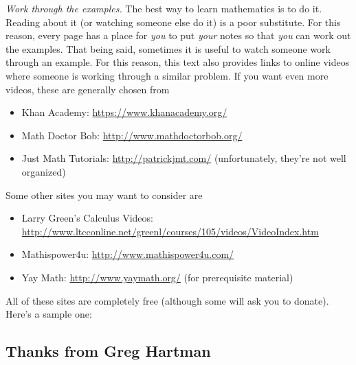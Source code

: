 \emph{Work through the examples.}  The best way to learn mathematics is to do it.  Reading about it (or watching someone else do it) is a poor substitute.  For this reason, every page has a place for \emph{you} to put \emph{your} notes so that \emph{you} can work out the examples.  That being said, sometimes it is useful to watch someone work through an example.  For this reason, this text also provides links to online videos where someone is working through a similar problem.  If you want even more videos, these are generally chosen from
\iflatexml\begin{itemize}\else\begin{itemize}[nosep]\fi
\item Khan Academy: \url{https://www.khanacademy.org/}
\item Math Doctor Bob: \url{http://www.mathdoctorbob.org/}
\item Just Math Tutorials: \url{http://patrickjmt.com/} (unfortunately, they're not well organized)
\end{itemize}
Some other sites you may want to consider are
\iflatexml\begin{itemize}\else\begin{itemize}[nosep]\fi
\item Larry Green's Calculus Videos: \url{http://www.ltcconline.net/greenl/courses/105/videos/VideoIndex.htm}
\item Mathispower4u: \url{http://www.mathispower4u.com/}
\item Yay Math: \url{http://www.yaymath.org/} (for prerequisite material)
\end{itemize}
All of these sites are completely free (although some will ask you to donate).  Here's a sample one:



\subsection{Thanks from Greg Hartman}


\end{itemize}
\end{itemize}
